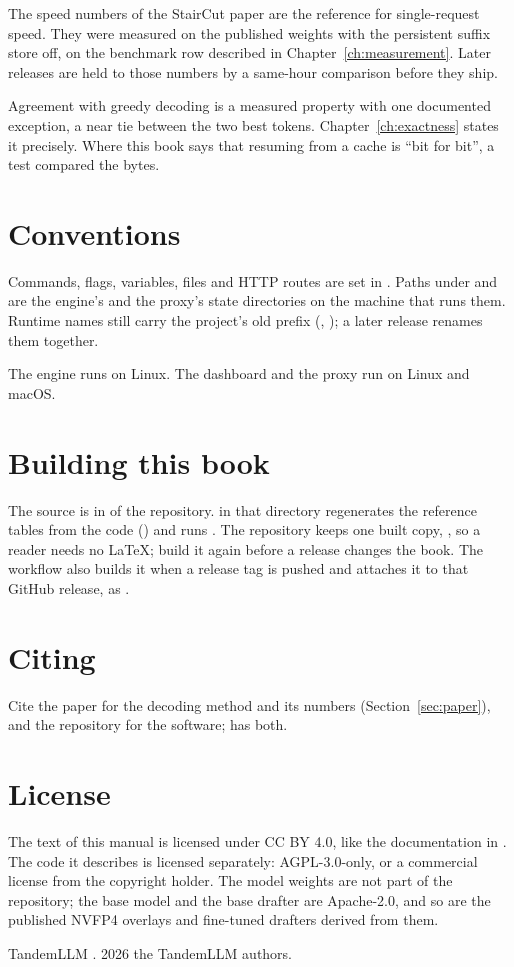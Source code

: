 The speed numbers of the StairCut paper are the reference for single-request speed. They were measured on the published weights with the persistent suffix store off, on the benchmark row described in Chapter~\ref{ch:measurement}. Later releases are held to those numbers by a same-hour comparison before they ship.

Agreement with greedy decoding is a measured property with one documented exception, a near tie between the two best tokens. Chapter~\ref{ch:exactness} states it precisely. Where this book says that resuming from a cache is \enquote{bit for bit}, a test compared the bytes.

\section*{Conventions}

Commands, flags, variables, files and HTTP routes are set in . Paths under  and  are the engine's and the proxy's state directories on the machine that runs them. Runtime names still carry the project's old prefix (, ); a later release renames them together.

The engine runs on Linux. The dashboard and the proxy run on Linux and macOS.

\section*{Building this book}

The source is in  of the repository.  in that directory regenerates the reference tables from the code () and runs . The repository keeps one built copy, , so a reader needs no LaTeX; build it again before a release changes the book. The  workflow also builds it when a release tag is pushed and attaches it to that GitHub release, as .

\section*{Citing}

Cite the paper for the decoding method and its numbers (Section~\ref{sec:paper}), and the repository for the software;  has both.

\section*{License}

The text of this manual is licensed under CC BY 4.0, like the documentation in . The code it describes is licensed separately: AGPL-3.0-only, or a commercial license from the copyright holder. The model weights are not part of the repository; the base model and the base drafter are Apache-2.0, and so are the published NVFP4 overlays and fine-tuned drafters derived from them.

\vfill
{\small\color{slate} TandemLLM \version. \textcopyright{} 2026 the TandemLLM authors.}
